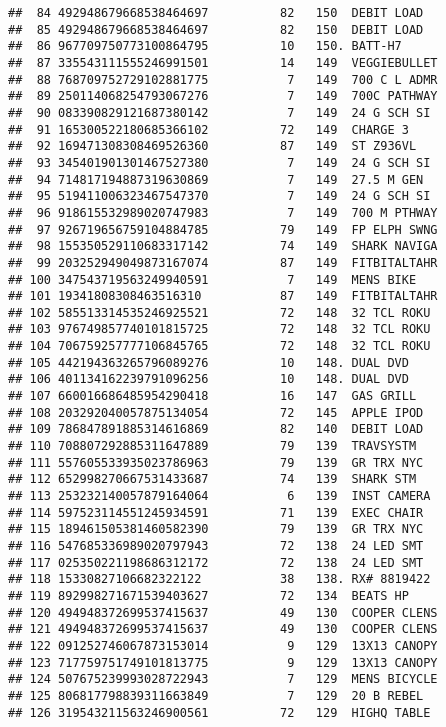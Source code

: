 \documentclass[]{article}
\begin{document}
\begin{verbatim}
##  84 492948679668538464697          82   150  DEBIT LOAD  
##  85 492948679668538464697          82   150  DEBIT LOAD  
##  86 967709750773100864795          10   150. BATT-H7     
##  87 335543111555246991501          14   149  VEGGIEBULLET
##  88 768709752729102881775           7   149  700 C L ADMR
##  89 250114068254793067276           7   149  700C PATHWAY
##  90 083390829121687380142           7   149  24 G SCH SI 
##  91 165300522180685366102          72   149  CHARGE 3    
##  92 169471308308469526360          87   149  ST Z936VL   
##  93 345401901301467527380           7   149  24 G SCH SI 
##  94 714817194887319630869           7   149  27.5 M GEN  
##  95 519411006323467547370           7   149  24 G SCH SI 
##  96 918615532989020747983           7   149  700 M PTHWAY
##  97 926719656759104884785          79   149  FP ELPH SWNG
##  98 155350529110683317142          74   149  SHARK NAVIGA
##  99 203252949049873167074          87   149  FITBITALTAHR
## 100 347543719563249940591           7   149  MENS BIKE   
## 101 19341808308463516310           87   149  FITBITALTAHR
## 102 585513314535246925521          72   148  32 TCL ROKU 
## 103 976749857740101815725          72   148  32 TCL ROKU 
## 104 706759257777106845765          72   148  32 TCL ROKU 
## 105 442194363265796089276          10   148. DUAL DVD    
## 106 401134162239791096256          10   148. DUAL DVD    
## 107 660016686485954290418          16   147  GAS GRILL   
## 108 203292040057875134054          72   145  APPLE IPOD  
## 109 786847891885314616869          82   140  DEBIT LOAD  
## 110 708807292885311647889          79   139  TRAVSYSTM   
## 111 557605533935023786963          79   139  GR TRX NYC  
## 112 652998270667531433687          74   139  SHARK STM   
## 113 253232140057879164064           6   139  INST CAMERA 
## 114 597523114551245934591          71   139  EXEC CHAIR  
## 115 189461505381460582390          79   139  GR TRX NYC  
## 116 547685336989020797943          72   138  24 LED SMT  
## 117 025350221198686312172          72   138  24 LED SMT  
## 118 15330827106682322122           38   138. RX# 8819422 
## 119 892998271671539403627          72   134  BEATS HP    
## 120 494948372699537415637          49   130  COOPER CLENS
## 121 494948372699537415637          49   130  COOPER CLENS
## 122 091252746067873153014           9   129  13X13 CANOPY
## 123 717759751749101813775           9   129  13X13 CANOPY
## 124 507675239993028722943           7   129  MENS BICYCLE
## 125 806817798839311663849           7   129  20 B REBEL  
## 126 319543211563246900561          72   129  HIGHQ TABLE 

\end{verbatim}
\end{document}
